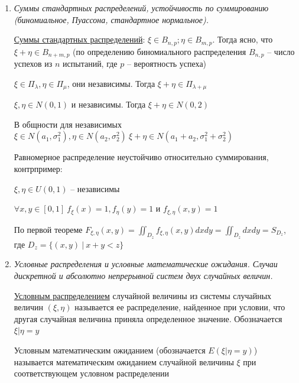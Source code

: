 \begin{enumerate}
    \hyperlink{convolutionformula}{Плотность суммы}: \Ths $\letsymbol \xi_1, \xi_2$ -- независимые абсолютно непрерывные случайные величины с плотностями
    $f_{\xi_1}(x)$ и $f_{\xi_2}(y)$

    Тогда плотность суммы $\xi_1 + \xi_2$ равна $f_{\xi_1 + \xi_2}(t) = \int_{-\infty}^\infty 
    \underset{\text{т. н. свертка}}{\underbrace{f_{\xi_1}(x) f_{\xi_2}(t - x)}} dx$

    \item \textit{Суммы стандартных распределений, устойчивость по суммированию (биномиальное, Пуассона, стандартное нормальное).}

    \hyperlink{sumofstandarddistributions}{Суммы стандартных распределений}: 
     $\xi \in B_{n, p}; \eta \in B_{m, p}$. Тогда ясно, что $\xi + \eta \in B_{n + m, p}$ 
    (по определению биномиального распределения $B_{n, p}$ -- число успехов из $n$ испытаний, где $p$ -- вероятность успеха)

     $\xi \in \Pi_{\lambda}, \eta \in \Pi_{\mu}$, они независимы. Тогда $\xi + \eta \in \Pi_{\lambda + \mu}$

     $\xi, \eta \in N(0, 1)$ и независимы. Тогда $\xi + \eta \in N(0, 2)$

     В общности для независимых $\xi \in N(a_1, \sigma^2_1), \eta \in N(a_2, \sigma_2^2) \ \xi + \eta \in N(a_1 + a_2, \sigma_1^2 + \sigma_2^2)$ 

     Равномерное распределение неустойчиво относительно суммирования, контрпример:

    $\xi, \eta \in U(0, 1)$ -- независимы

    $\forall x, y \in [0, 1] \ f_{\xi}(x) = 1, f_\eta(y) = 1$ и $f_{\xi, \eta}(x, y) = 1$

    По первой теореме $F_{\xi, \eta}(x, y) = \iint_{D_z} f_{\xi, \eta}(x, y) dxdy = \iint_{D_z} dxdy = S_{D_z}$, где $D_z = \{(x, y) \ | \ x + y < z\}$

    \item \textit{Условные распределения и условные математические ожидания. Случаи дискретной и абсолютно непрерывной систем двух случайных величин.}

    \hyperlink{conditionaldistribution}{Условным распределением} случайной величины из системы случайных величин $(\xi, \eta)$ 
    называется ее распределение, найденное при условии, что другая случайная величина приняла 
    определенное значение. Обозначается $\xi | \eta = y$

    Условным математическим ожиданием (обозначается $E(\xi | \eta = y)$) называется 
    математическим ожиданием случайной величины $\xi$ при соответствующем условном распределении


\end{enumerate}
